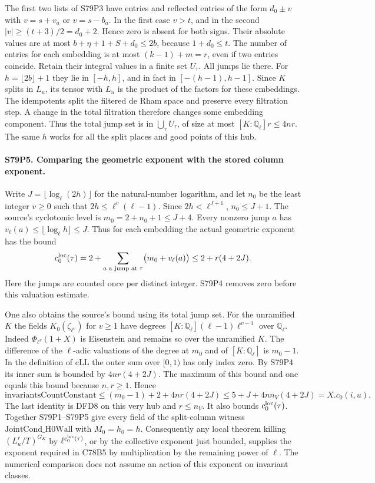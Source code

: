 The first two lists of S79P3 have entries and reflected entries of
the form $d_0\pm v$ with $v=s+v_a$ or $v=s-b_a$.
In the first case $v>t$, and in the second
$|v|\ge(t+3)/2=d_0+2$. Hence zero is absent for both signs.
Their absolute values are at most
$b+\eta+1+S+d_0\le2b$, because $1+d_0\le t$.
The number of entries for each embedding is at most
$(k-1)+m=r$, even if two entries coincide. Retain their integral
values in a finite set $U_\tau$. All jumps lie there. For
$h=\lfloor2b\rfloor+1$ they lie in $[-h,h]$, and in fact in
$[-(h-1),h-1]$. Since $K$ splits in $L_u$, its tensor with $L_u$
is the product of the factors for these embeddings. The idempotents
split the filtered de Rham space and preserve every filtration
step. A change in the total filtration therefore changes some
embedding component. Thus the total jump set is in
$\bigcup_\tau U_\tau$, of size at most $[K:\mathbb Q_\ell]r\le4nr$.
The same $h$ works for all the split places and good points of
this hub.

\paragraph{S79P5. Comparing the geometric exponent with the stored column exponent.}
Write $J=\lfloor\log_\ell(2h)\rfloor$ for the natural-number
logarithm, and let $n_0$ be the least integer $v\ge0$ such that
$2h\le\ell^v(\ell-1)$. Since $2h<\ell^{J+1}$, $n_0\le J+1$.
The source's cyclotomic level is $m_0=2+n_0+1\le J+4$.
Every nonzero jump $a$ has
$v_\ell(a)\le\lfloor\log_\ell h\rfloor\le J$. Thus for each
embedding the actual geometric exponent has the bound
\[
 c_0^{\rm loc}(\tau)
    =2+\sum_{a\text{ a jump at }\tau}\bigl(m_0+v_\ell(a)\bigr)
    \le 2+r(4+2J).
\]
Here the jumps are counted once per distinct integer. S79P4 removes
zero before this valuation estimate.

One also obtains the source's bound using its total jump set.
For the unramified $K$ the fields
$K_0(\zeta_{\ell^v})$ for $v\ge1$ have degrees
$[K:\mathbb Q_\ell](\ell-1)\ell^{v-1}$ over $\mathbb Q_\ell$.
Indeed $\Phi_{\ell^v}(1+X)$ is Eisenstein and remains so over
the unramified $K$. The difference of the $\ell$-adic valuations
of the degree at $m_0$ and of $[K:\mathbb Q_\ell]$ is $m_0-1$.
In the definition of $\mathrm{cLL}$ the outer sum over $[0,1)$
has only index zero. By S79P4 its inner sum is bounded by
$4nr(4+2J)$. The maximum of this bound and one equals this bound
because $n,r\ge1$. Hence
\[
  \mathrm{invariantsCountConstant}
    \le (m_0-1)+2+4nr(4+2J)
    \le 5+J+4n n_V(4+2J)=X.c_0(i,u).
\]
The last identity is DFD8 on this very hub and $r\le n_V$.
It also bounds $c_0^{\rm loc}(\tau)$. Together S79P1--S79P5 give
every field of the split-column witness
$\mathrm{JointCond\_H0Wall}$ with $M_0=h_0=h$.
Consequently any local theorem killing $(L_u^r/T)^{G_K}$ by
$\ell^{c_0^{\rm loc}(\tau)}$, or by the collective exponent just
bounded, supplies the exponent required in C78B5 by multiplication
by the remaining power of $\ell$. The numerical comparison does
not assume an action of this exponent on invariant classes.
